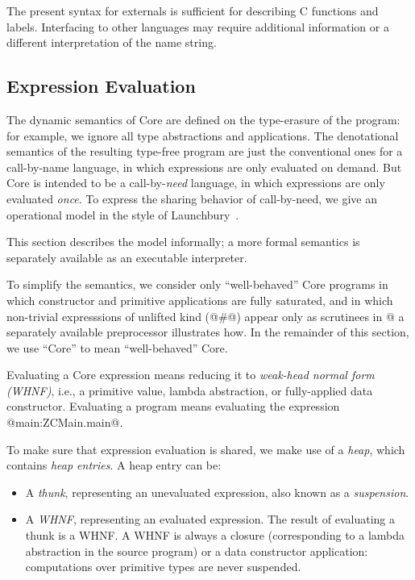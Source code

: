 \documentclass[10pt]{article}
\begin{document}
The present syntax for externals is sufficient for describing C functions and labels.
Interfacing to other languages may require additional information or a different interpretation
of the name string.


\subsection{Expression Evaluation}  
\label{sec:evaluation}

The dynamic semantics of Core are defined on the type-erasure of the program: for example, we ignore all type abstractions and applications.  The denotational semantics of
the resulting type-free program are just the conventional ones for a call-by-name
language, in which expressions are only evaluated on demand.
But Core is intended to be a call-by-{\it{need}} language, in which
expressions are only evaluated {\it once}.  To express the sharing behavior
of call-by-need, we give an operational model in the style of Launchbury~\citep{launchbury93natural}.

This section describes the model informally; a more formal semantics is
separately available as an executable interpreter.

To simplify the semantics, we consider only ``well-behaved'' Core programs in which
constructor and primitive applications are fully saturated, and in which
non-trivial expresssions of unlifted kind (@#@) appear only as scrutinees
in @%
a separately available preprocessor illustrates how.
In the remainder of this section, we use ``Core'' to mean ``well-behaved'' Core.

Evaluating a Core expression means reducing it to {\it weak-head normal form (WHNF)},
i.e., a primitive value, lambda abstraction, or fully-applied data constructor. Evaluating a program means evaluating the expression @main:ZCMain.main@.

To make sure that expression evaluation is shared, we
make use of a {\it heap}, which contains {\it heap entries}. A heap entry can be:
\begin{itemize}
\item A {\em thunk}, representing an unevaluated expression, also known as a {\em suspension}.

\item A {\em WHNF}, representing an evaluated expression. The result of evaluating a thunk is a WHNF. A WHNF is always a closure (corresponding to a lambda abstraction in the source program) or a data constructor application: computations over primitive types are never suspended.
\end{itemize}
\end{document}

